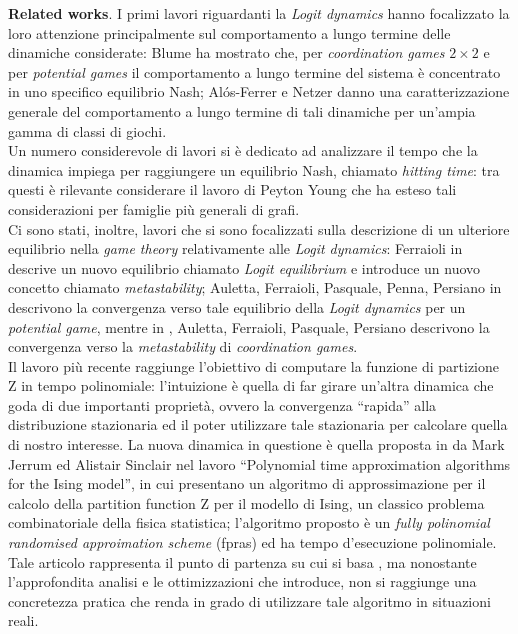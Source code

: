 \textbf{Related works}. I primi lavori riguardanti la \textit{Logit dynamics} hanno focalizzato la loro attenzione principalmente sul comportamento a lungo termine delle dinamiche considerate: Blume \cite{blume1993statistical} ha mostrato che, per \textit{coordination games} $2 \times 2$ e per \textit{potential games} il comportamento a lungo termine del sistema è concentrato in uno specifico equilibrio Nash; Al{\'o}s-Ferrer e Netzer \cite{alos2010logit} danno una caratterizzazione generale del comportamento a lungo termine di tali dinamiche per un’ampia gamma di classi di giochi.\\
Un numero considerevole di lavori si è dedicato ad analizzare il tempo che la dinamica impiega per raggiungere un equilibrio Nash, chiamato \textit{hitting time}: tra questi è rilevante considerare il lavoro di Peyton Young \cite{young2006diffusion} che ha esteso tali considerazioni per famiglie più generali di grafi.\\
Ci sono stati, inoltre, lavori che si sono focalizzati sulla descrizione di un ulteriore equilibrio nella \textit{game theory} relativamente alle \textit{Logit dynamics}: Ferraioli in \cite{ferraioli2012logit} descrive un nuovo equilibrio chiamato \textit{Logit equilibrium} e introduce un nuovo concetto chiamato \textit{metastability}; Auletta, Ferraioli, Pasquale, Penna, Persiano in \cite{auletta2011convergence} descrivono la convergenza verso tale equilibrio della \textit{Logit dynamics} per un \textit{potential game}, mentre in \cite{auletta2012metastability}, Auletta, Ferraioli, Pasquale, Persiano descrivono la convergenza verso la \textit{metastability} di \textit{coordination games}.\\
Il lavoro più recente \cite{rinaldi2016approximation} raggiunge l'obiettivo di computare la funzione di partizione Z in tempo polinomiale: l'intuizione è quella di far girare un'altra dinamica che goda di due importanti proprietà, ovvero la convergenza ``rapida'' alla distribuzione stazionaria ed il poter utilizzare tale stazionaria per calcolare quella di nostro interesse. La nuova dinamica in questione è quella proposta in \cite{jerrum1993polynomial} da Mark Jerrum ed Alistair Sinclair nel lavoro ``Polynomial time approximation algorithms for the Ising model'', in cui presentano un algoritmo di approssimazione per il calcolo della partition function Z per il modello di Ising, un classico problema combinatoriale della fisica statistica; l’algoritmo proposto è un \textit{fully polinomial randomised approimation scheme} (fpras) ed ha tempo d’esecuzione polinomiale. Tale articolo rappresenta il punto di partenza su cui si basa \cite{rinaldi2016approximation}, ma nonostante l'approfondita analisi e le ottimizzazioni che introduce, non si raggiunge una concretezza pratica che renda in grado di utilizzare tale algoritmo in situazioni reali.\\

